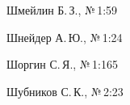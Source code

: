 \begin{theindex}
  


  \vspace*{3pt}





\item Шмейлин Б.\,З., №\,1:59


\item Шнейдер А.\,Ю., №\,1:24


\item Шоргин С.\,Я., №\,1:165


\item Шубников С.\,К., №\,2:23














\def\leftheadline{\noindent\hbox to 0.9\textwidth{\footnotesize%


\hspace*{-6pt}\strut \hfill {\sect}%


}}


\def\rightheadline{\noindent\hbox to 0.9\textwidth{\footnotesize%


\razd


\strut\hfill


\hspace*{-4pt}


}}








\end{theindex}








\newpage


